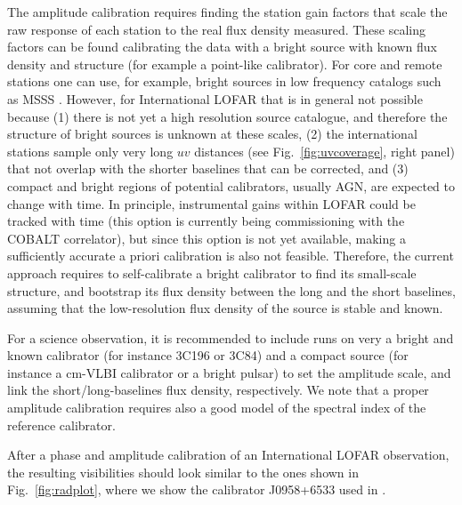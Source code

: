 \documentclass[graybox]{svmult}
\begin{document}
The amplitude calibration requires finding the station gain factors that scale
the raw response of each station to the real flux density measured.  These
scaling factors can be found calibrating the data with a bright source with
known flux density and structure (for example a point-like calibrator).  For
core and remote stations one can use, for example, bright sources in low
frequency catalogs such as MSSS \citep{heald14}. However, for International
LOFAR that is in general not possible because (1) there is not yet a
high resolution source catalogue, and therefore the structure of bright sources
is unknown at these scales, (2) the international stations sample only very long
$uv$ distances (see Fig.~\ref{fig:uvcoverage}, right panel) that not overlap
with the shorter baselines that can be corrected, and (3) compact and bright
regions of potential calibrators, usually AGN, are expected to change with
time. In principle, instrumental gains within LOFAR could be tracked with time
(this option is currently being commissioning with the COBALT correlator), but
since this option is not yet available, making a sufficiently  accurate a
priori calibration is also not feasible. Therefore, the current approach
requires to self-calibrate a bright calibrator to find its small-scale
structure, and bootstrap its flux density between the long and the short
baselines, assuming that the low-resolution flux density of the source is
stable and known. 

For a science observation, it is recommended to include runs on very a bright
and known calibrator (for instance 3C196 or 3C84) and a compact source
(for instance a cm-VLBI calibrator or a bright pulsar) to set the amplitude
scale, and link the short/long-baselines flux density, respectively. We
note that a proper amplitude calibration requires also a good model of the
spectral index of the reference calibrator.  

After a phase and amplitude calibration of an International LOFAR observation,
the resulting visibilities should look similar to the ones shown in
Fig.~\ref{fig:radplot}, where we show the calibrator J0958+6533 used in
\cite{varenius15}. 
\end{document}
